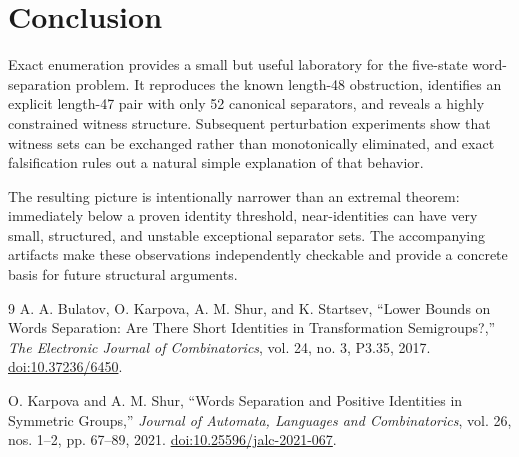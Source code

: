 \documentclass[10pt]{article}
\begin{document}
\section{Conclusion}
Exact enumeration provides a small but useful laboratory for the five-state word-separation problem.  It reproduces the known length-48 obstruction, identifies an explicit length-47 pair with only 52 canonical separators, and reveals a highly constrained witness structure.  Subsequent perturbation experiments show that witness sets can be exchanged rather than monotonically eliminated, and exact falsification rules out a natural simple explanation of that behavior.

The resulting picture is intentionally narrower than an extremal theorem: immediately below a proven identity threshold, near-identities can have very small, structured, and unstable exceptional separator sets.  The accompanying artifacts make these observations independently checkable and provide a concrete basis for future structural arguments.

\begin{thebibliography}{9}
A. A. Bulatov, O. Karpova, A. M. Shur, and K. Startsev,
``Lower Bounds on Words Separation: Are There Short Identities in Transformation Semigroups?,''
\emph{The Electronic Journal of Combinatorics}, vol. 24, no. 3, P3.35, 2017.
\href{https://doi.org/10.37236/6450}{doi:10.37236/6450}.

O. Karpova and A. M. Shur,
``Words Separation and Positive Identities in Symmetric Groups,''
\emph{Journal of Automata, Languages and Combinatorics}, vol. 26, nos. 1--2, pp. 67--89, 2021.
\href{https://doi.org/10.25596/jalc-2021-067}{doi:10.25596/jalc-2021-067}.
\end{thebibliography}
\end{document}
